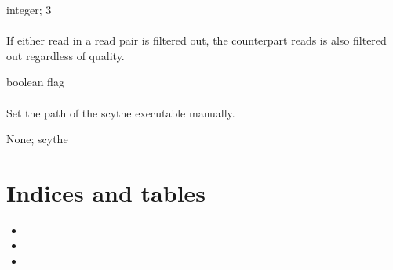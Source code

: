 \documentclass[letterpaper,10pt,english]{sphinxmanual}
\begin{document}
 integer;  3


\subsubsection{}
\label{\detokenize{prog_desc:u-filter-unpaired}}
 If either read in a read pair is filtered out, the counterpart reads is also filtered out regardless of quality.

 boolean flag


\subsubsection{}
\label{\detokenize{prog_desc:x-scythe-executable}}
 Set the path of the scythe executable manually.

 None;  scythe


\chapter{Indices and tables}
\label{\detokenize{index:indices-and-tables}}\begin{itemize}
\item {} 

\item {} 

\item {} 

\end{itemize}



\renewcommand{\indexname}{Index}
\printindex
\end{document}

